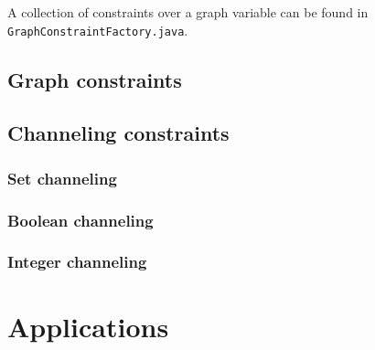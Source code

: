 \documentclass{doc}
\begin{document}
A collection of constraints over a graph variable can be found in \texttt{GraphConstraintFactory.java}.

\subsection{Graph constraints}

\subsection{Channeling constraints}

\subsubsection{Set channeling}

\subsubsection{Boolean channeling}

\subsubsection{Integer channeling}

\section{Applications}
\end{document}
